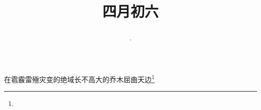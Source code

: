 \title{\date[d=13,m=5,y=2024][year:cn-y,年,month:cn,day:cn,日,·,weekday]·四月初六 }
在雹霰雷殛灾变的绝域长不高大的乔木屈曲天边\footnote{ }

